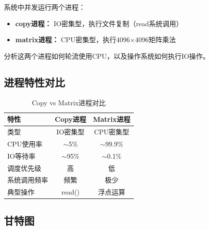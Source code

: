 \documentclass[UTF8,a4paper,12pt]{ctexart}
\begin{document}
系统中并发运行两个进程：
\begin{itemize}
    \item \textbf{copy进程：} IO密集型，执行文件复制（read系统调用）
    \item \textbf{matrix进程：} CPU密集型，执行4096×4096矩阵乘法
\end{itemize}

分析这两个进程如何轮流使用CPU，以及操作系统如何执行IO操作。

\subsection{进程特性对比}

\begin{table}[H]
\centering
\caption{Copy vs Matrix进程对比}
\begin{tabular}{lcc}
\toprule
\textbf{特性} & \textbf{Copy进程} & \textbf{Matrix进程} \\
\midrule
类型 & IO密集型 & CPU密集型 \\
CPU使用率 & $\sim$5\% & $\sim$99.9\% \\
IO等待率 & $\sim$95\% & $\sim$0.1\% \\
调度优先级 & 高 & 低 \\
系统调用频率 & 频繁 & 极少 \\
典型操作 & read() & 浮点运算 \\
\bottomrule
\end{tabular}
\end{table}

\subsection{甘特图}
\end{document}
